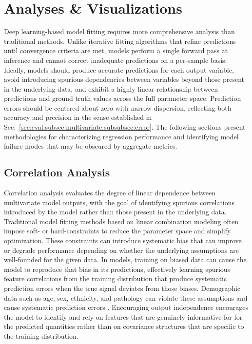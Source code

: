 \section{Analyses \& Visualizations}\label{sec:Reg}
Deep learning-based model fitting requires more comprehensive analysis than traditional methods. Unlike iterative fitting algorithms that refine predictions until convergence criteria are met, \DL models perform a single forward pass at inference and cannot correct inadequate predictions on a per-sample basis. Ideally, \DL models should produce accurate predictions for each output variable, avoid introducing spurious dependencies between variables beyond those present in the underlying data, and exhibit a highly linear relationship between predictions and ground truth values across the full parameter space. Prediction errors should be centered about zero with narrow dispersion, reflecting both accuracy and precision in the sense established in Sec.~\ref{sec:eval:subsec:multivariate:subsubsec:error}. The following sections present methodologies for characterizing regression performance and identifying model failure modes that may be obscured by aggregate metrics.

\subsection{Correlation Analysis}
Correlation analysis evaluates the degree of linear dependence between multivariate model outputs, with the goal of identifying spurious correlations introduced by the model rather than those present in the underlying data. Traditional model fitting methods based on linear combination modeling often impose soft- or hard-constraints to reduce the parameter space and simplify optimization. These constraints can introduce systematic bias that can improve or degrade performance depending on whether the underlying assumptions are well-founded for the given data. In \DL models, training on biased data can cause the model to reproduce that bias in its predictions, effectively learning spurious feature correlations from the training distribution that produce systematic prediction errors when the true signal deviates from those biases. Demographic data such as age, sex, ethnicity, and pathology can violate these assumptions and cause systematic prediction errors \cite{Banerjee2023}. Encouraging output independence encourages the model to identify and rely on features that are genuinely informative for for the predicted quantities rather than on covariance structures that are specific to the training distribution.

